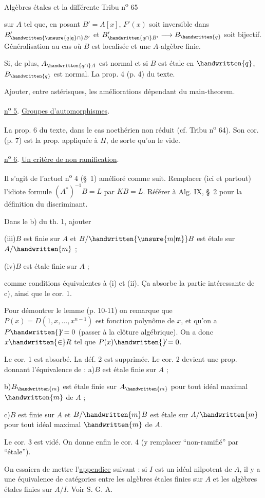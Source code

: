 Algèbres étales et la différente \hfill Tribu n\textsuperscript{o} 65

sur $A$ tel que, en posant $B'=A[x]$, $F'(x)$ soit inversible dans $B'_{\handwritten{\unsure{q|\mathfrak{q}}\cap}B'}$ et
$B'_{\handwritten{q\cap}B'}\longrightarrow B_{\handwritten{q}}$ soit bijectif. Généralisation au cas où $B$ est localisée et une
$A$-algèbre finie.

Si, de plus, $A_{\handwritten{q\cap}A}$ est normal et si $B$ est étale en $\handwritten{q}$, $B_{\handwritten{q}}$ est normal.
La prop. 4 (p. 4) du texte.

Ajouter, entre astérisques, les améliorations dépendant du main-theorem.

\uline{n\textsuperscript{o} 5}. \uline{Groupes d'automorphismes}.

La prop. 6 du texte, dans le cas noethérien non réduit (cf. Tribu n\textsuperscript{o} 64). Son cor.
(p. 7) est la prop. appliquée à $H$, de sorte qu'on le vide.

\uline{n\textsuperscript{o} 6}. \uline{Un critère de non ramification}.

Il s'agit de l'actuel n\textsuperscript{o} 4 (\S~1) amélioré comme suit. Remplacer (ici et partout)
l'idiote formule $(A^{*})^{-1}B=L$ par $KB=L$. Référer à Alg. IX, \S~2 pour la définition
du discriminant.

Dans le b) du th. 1, ajouter

(iii)\qquad $B$ est finie sur $A$ et $B/\handwritten{\unsure{m|\mathfrak{m}}}B$ est étale sur $A/\handwritten{m}$ ;

(iv)\qquad $B$ est étale finie sur $A$ ;

comme conditions équivalentes à (i) et (ii). Ça absorbe la partie intéressante de c),
ainsi que le cor. 1.

Pour démontrer le lemme (p. 10-11) on remarque que $P(x)=D(1,x,\ldots,x^{n-1})$ est
fonction polynôme de $x$, et qu'on a $P\handwritten{\not}=0$ (passer à la clôture algébrique). On a
donc $x\handwritten{\in}R$ tel que $P(x)\handwritten{\not}=0$.

Le cor. 1 est absorbé. La déf. 2 est supprimée. Le cor. 2 devient une prop. donnant
l'équivalence de : a)\quad $B$ est étale finie sur $A$ ;

b)\quad $B_{\handwritten{m}}$ est étale finie sur $A_{\handwritten{m}}$ pour tout idéal maximal $\handwritten{m}$ de $A$ ;

c)\quad $B$ est finie sur $A$ et $B/\handwritten{m}B$ est étale sur $A/\handwritten{m}$ pour tout
idéal maximal $\handwritten{m}$ de $A$.

Le cor. 3 est vidé. On donne enfin le cor. 4 (y remplacer ``non-ramifié'' par
``étale'').

On essaiera de mettre l'\uline{appendice} suivant : si $I$ est un idéal nilpotent de $A$,
il y a une équivalence de catégories entre les algèbres étales finies sur $A$ et les
algèbres étales finies sur $A/I$. Voir S. G. A.

